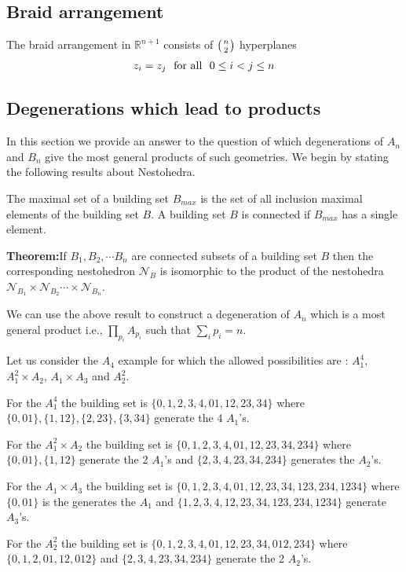 \documentclass[hidelinks,12pt]{article}
\newcommand{\bea}[1]{\begin{eqnarray}\label{#1} }
\newcommand{\eea}{\end{eqnarray}}
\def\bea{\begin{eqnarray}}
\def\eea{\end{eqnarray}}
\begin{document}
\subsection*{Braid arrangement}
The braid arrangement in $\mathbb{R}^{n+1}$ consists of $\left({n}\atop{2}\right)$ hyperplanes 
\bea
z_i =z_j ~~{\rm for ~ all}~~0 \leq i<j \leq n
\eea 

\subsection*{Degenerations which lead to products}
In this section we provide an answer to the question of which degenerations of $A_n$ and $B_n$ give the most general products of such geometries. We begin by stating the following results about Nestohedra.

The maximal set of a building set $B_{max}$ is the set of all inclusion maximal elements of the building set $B$. A building set $B$ is connected if $B_{max}$ has a single element.

{\bf Theorem:}If $B_1, B_2,\cdots B_n$ are connected subsets of a building set $B$ then the corresponding nestohedron ${\mathscr N_B}$ is isomorphic to the product of the nestohedra ${\mathscr N}_{ B_1} \times{\mathscr N}_{ B_2} \cdots \times {\mathscr N}_{B_n}$.

We can use the above result to construct 	a degeneration of $A_n$ which is a most general product i.e., $\prod_{p_i} A_{p_i}$ such that $\sum_{i} p_{i} = n$. 

Let us consider the  $A_4$ example for which the allowed possibilities are : $A_1^{4}$, $A_1^2 \times A_2$, $A_1 \times A_3$ and $A^{2}_2$.
 
For the $A_1^{4}$ the building set is $ \{ {0},{1},{2},{3},{4},{01},{12},{23},{34} \}$ where $\{0,01\} , \{1,12\},\{2,23\},\{3,34\}$ generate the 4 $A_1$'s.

For the $A_1^{2} \times A_2$ the building set is $ \{ {0},{1},{2},{3},{4},{01},{12},{23},{34},{234} \}$ where $\{0,01\} , \{1,12\} $ generate the 2 $A_1$'s and $\{2,3,4,23,34,234\}$ generates the $A_2$'s.

For the $A_1 \times A_3$ the building set is $ \{ {0},{1},{2},{3},{4},{01},{12},{23},{34},{123},{234},{1234} \}$ where $\{0,01\}$ is the generates the $A_1$ and $\{{1},{2},{3},{4},{12},{23},{34},{123},{234},{1234} \}$ generate  $A_3$'s.

For the $A_2^{2}$ the building set is $ \{ {0},{1},{2},{3},{4},{01},{12},{23},{34} ,{012},{234}\}$ where $\{0,1,2,01,12,012\}$  and $\{2,3,4,23,34,234\}$ generate the 2 $A_2$'s.
\end{document}

